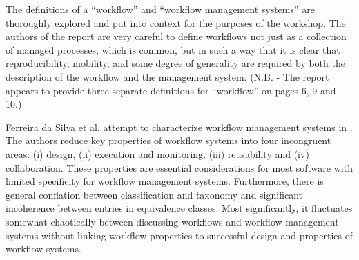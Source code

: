 The definitions of a ``workflow'' and ``workflow management systems''
are thoroughly explored and put into context for the purposes of the
workshop. The authors of the report are very careful to define workflows
not just as a collection of managed processes, which is common, but in
such a way that it is clear that reproducibility, mobility, and some
degree of generality are required by both the description of the
workflow and the management system. (N.B. - The report appears to provide three separate definitions for ``workflow'' on pages 6, 9 and 10.)

Ferreira da Silva et al. attempt to characterize workflow management systems in 
\cite{ferreira_da_silva_characterization_nodate}. The authors reduce key properties of workflow
systems into four incongruent areas: (i) design, (ii) execution and monitoring, (iii)
reusability and (iv) collaboration. These properties are essential
considerations for most  software with limited specificity for workflow
management systems. Furthermore, there is general conflation between
classification and taxonomy and significant incoherence between entries in
equivalence classes. Most significantly, it fluctuates somewhat chaotically
between discussing workflows and workflow management systems without linking
workflow properties to successful design and properties of workflow systems.
